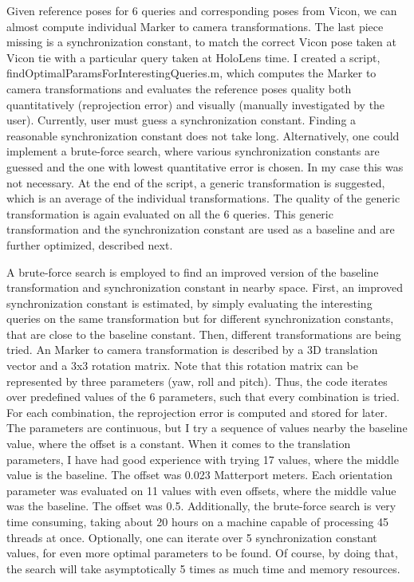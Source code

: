 \documentclass[twoside]{ctuthesis}
\theoremstyle{plain}
\theoremstyle{definition}
\theoremstyle{note}
\begin{document}
Given reference poses for 6 queries and corresponding poses from Vicon, we can almost compute individual Marker to camera transformations. The last piece missing is a synchronization constant, to match the correct Vicon pose taken at Vicon tie with a particular query taken at HoloLens time. I created a script, findOptimalParamsForInterestingQueries.m, which computes the Marker to camera transformations and evaluates the reference poses quality both quantitatively (reprojection error) and visually (manually investigated by the user). Currently, user must guess a synchronization constant. Finding a reasonable synchronization constant does not take long. Alternatively, one could implement a brute-force search, where various synchronization constants are guessed and the one with lowest quantitative error is chosen. In my case this was not necessary. At the end of the script, a generic transformation is suggested, which is an average of the individual transformations. The quality of the generic transformation is again evaluated on all the 6 queries. This generic transformation and the synchronization constant are used as a baseline and are further optimized, described next.

A brute-force search is employed to find an improved version of the baseline transformation and synchronization constant in nearby space. First, an improved synchronization constant is estimated, by simply evaluating the interesting queries on the same transformation but for different synchronization constants, that are close to the baseline constant. Then, different transformations are being tried. An Marker to camera transformation is described by a 3D translation vector and a 3x3 rotation matrix. Note that this rotation matrix can be represented by three parameters (yaw, roll and pitch). Thus, the code iterates over predefined values of the 6 parameters, such that every combination is tried. For each combination, the reprojection error is computed and stored for later. The parameters are continuous, but I try a sequence of values nearby the baseline value, where the offset is a constant. When it comes to the translation parameters, I have had good experience with trying 17 values, where the middle value is the baseline. The offset was 0.023 Matterport meters. Each orientation parameter was evaluated on 11 values with even offsets, where the middle value was the baseline. The offset was 0.5\degree. Additionally, the brute-force search is very time consuming, taking about 20 hours on a machine capable of processing 45 threads at once. Optionally, one can iterate over 5 synchronization constant values, for even more optimal parameters to be found. Of course, by doing that, the search will take asymptotically 5 times as much time and memory resources.
\end{document}
